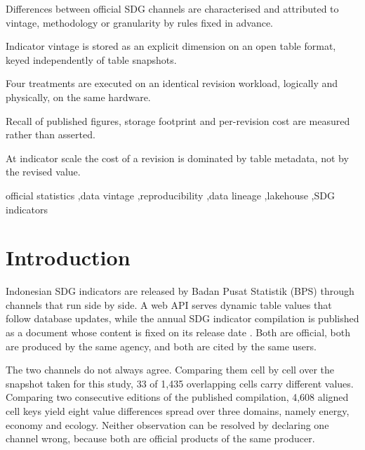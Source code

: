 \documentclass[a4paper,fleqn]{cas-dc}
\begin{document}
\begin{highlights}
\item Differences between official SDG channels are characterised and attributed
to vintage, methodology or granularity by rules fixed in advance.
\item Indicator vintage is stored as an explicit dimension on an open table
format, keyed independently of table snapshots.
\item Four treatments are executed on an identical revision workload, logically
and physically, on the same hardware.
\item Recall of published figures, storage footprint and per-revision cost are
measured rather than asserted.
\item At indicator scale the cost of a revision is dominated by table metadata,
not by the revised value.
\end{highlights}

\begin{keywords}
official statistics \sep data vintage \sep reproducibility \sep data lineage
\sep lakehouse \sep SDG indicators
\end{keywords}

\maketitle

\section{Introduction}\label{sec:intro}

Indonesian SDG indicators are released by Badan Pusat Statistik (BPS) through
channels that run side by side. A web API serves dynamic table values that
follow database updates, while the annual SDG indicator compilation is published
as a document whose content is fixed on its release date
\citep{bps_tpb2024,bps_tpb2025}. Both are official, both are produced by the
same agency, and both are cited by the same users.

The two channels do not always agree. Comparing them cell by cell over the
snapshot taken for this study, 33 of 1,435 overlapping cells carry different
values. Comparing two consecutive editions of the published compilation, 4,608
aligned cell keys yield eight value differences spread over three domains,
namely energy, economy and ecology. Neither observation can be resolved by
declaring one channel wrong, because both are official products of the same
producer.
\end{document}

